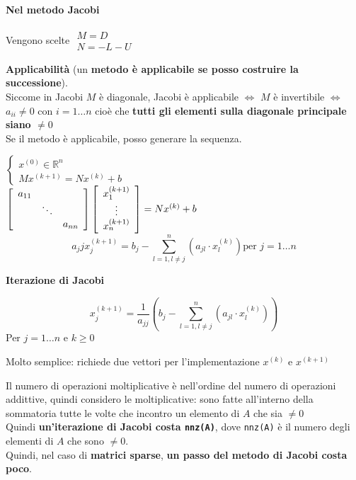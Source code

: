 \documentclass[10pt]{book}
\begin{document}
\paragraph{Nel metodo Jacobi} Vengono scelte $\begin{array}{l}
M = D\\N = -L-U
\end{array}$
\begin{list}{}{}
	\item \textbf{Applicabilità} (un \textbf{metodo è applicabile se posso costruire la successione}).\\
	Siccome in Jacobi $M$ è diagonale, Jacobi è applicabile $\Leftrightarrow$ $M$ è invertibile $\Leftrightarrow$ $a_{ii} \neq 0$ con $i = 1\ldots n$ cioè che \textbf{tutti gli elementi sulla diagonale principale siano $\neq 0$}\\
	Se il metodo è applicabile, posso generare la sequenza.
	\begin{multicols}{2}	
	$\left\{\begin{array}{l}
	x^{(0)} \in \mathbb{R}^n\\
	Mx^{(k+1)} = Nx^{(k)} + b
	\end{array}\right.$\\
	$\left[ \begin{array}{c c c}
	a_{11}\\
	& \ddots\\
	& & a_{nn}
	\end{array}\right] \left[ \begin{array}{c}
	x_1^{(k+1)}\\\vdots\\x_n^{(k+1)}
	\end{array} \right] = Nx^{(k)} + b$
	$$a_jj x_j^{(k+1)} = b_j - \sum_{l = 1, l\neq j}^n \left(a_{jl}\cdot x^{(k)}_l\right)\text{per }j = 1\ldots n$$
	\columnbreak
	\begin{center}
		\textbf{Iterazione di Jacobi}	
	\end{center}
	$$x_j^{(k+1)} = \frac{1}{a_{jj}} \left(b_j - \sum_{l = 1, l\neq j}^n \left(a_{jl}\cdot x^{(k)}_l\right)\right)$$
	Per $j = 1\ldots n$ e $k \geq 0$
	\end{multicols}
	\item Molto semplice: richiede due vettori per l'implementazione $x^{(k)}$ e $x^{(k+1)}$
	\item Il numero di operazioni moltiplicative è nell'ordine del numero di operazioni addittive, quindi considero le moltiplicative: sono fatte all'interno della sommatoria tutte le volte che incontro un elemento di $A$ che sia $\neq 0$\\
	Quindi \textbf{un'iterazione di Jacobi costa \texttt{nnz(A)}}, dove \texttt{nnz(A)} è il numero degli elementi di $A$ che sono $\neq 0$.\\
	Quindi, nel caso di \textbf{matrici sparse}, \textbf{un passo del metodo di Jacobi costa poco}.
\end{list}
\end{document}
